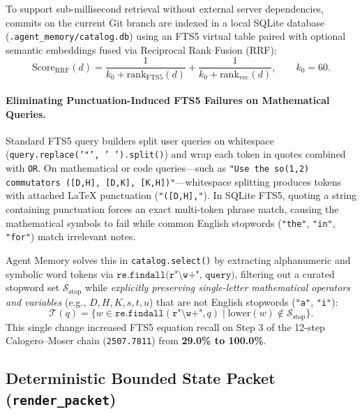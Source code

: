 \documentclass[11pt,a4paper]{article}
\begin{document}
To support sub-millisecond retrieval without external server dependencies, commits on the current Git branch are indexed in a local SQLite database (\texttt{.agent\_memory/catalog.db}) using an FTS5 virtual table paired with optional semantic embeddings fused via Reciprocal Rank Fusion (RRF):
\begin{equation}
    \text{Score}_{\text{RRF}}(d) = \frac{1}{k_0 + \text{rank}_{\text{FTS5}}(d)} + \frac{1}{k_0 + \text{rank}_{\text{vec}}(d)}, \qquad k_0 = 60.
\end{equation}

\paragraph{Eliminating Punctuation-Induced FTS5 Failures on Mathematical Queries.}
Standard FTS5 query builders split user queries on whitespace (\texttt{query.replace('"', ' ').split()}) and wrap each token in quotes combined with \texttt{OR}. On mathematical or code queries---such as \texttt{"Use the so(1,2) commutators ([D,H], [D,K], [K,H])"}---whitespace splitting produces tokens with attached LaTeX punctuation (\texttt{"([D,H],"}). In SQLite FTS5, quoting a string containing punctuation forces an exact multi-token phrase match, causing the mathematical symbols to fail while common English stopwords (\texttt{"the"}, \texttt{"in"}, \texttt{"for"}) match irrelevant notes.

Agent Memory solves this in \texttt{catalog.select()} by extracting alphanumeric and symbolic word tokens via $\texttt{re.findall(r"\textbackslash w+", query)}$, filtering out a curated stopword set $\mathcal{S}_{\text{stop}}$ while \emph{explicitly preserving single-letter mathematical operators and variables} (e.g., $D, H, K, s, t, u$) that are not English stopwords (\texttt{"a"}, \texttt{"i"}):
\begin{equation}
    \mathcal{T}(q) = \Big\{ w \in \texttt{re.findall}(\texttt{r"\textbackslash w+"}, q) \;\Big|\; \text{lower}(w) \notin \mathcal{S}_{\text{stop}} \Big\}.
\end{equation}
This single change increased FTS5 equation recall on Step 3 of the 12-step Calogero--Moser chain (\texttt{2507.7811}) from \textbf{29.0\% to 100.0\%}.

\subsection{Deterministic Bounded State Packet (\texttt{render\_packet})}
\end{document}
